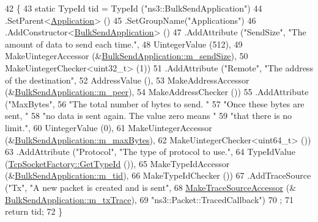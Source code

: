 \begin{DoxyCode}
42 \{
43   \textcolor{keyword}{static} TypeId tid = TypeId (\textcolor{stringliteral}{"ns3::BulkSendApplication"})
44     .SetParent<\hyperlink{classns3_1_1Application_acd261926c72b02cdb48fc7f8838ee173}{Application}> ()
45     .SetGroupName(\textcolor{stringliteral}{"Applications"}) 
46     .AddConstructor<\hyperlink{classns3_1_1BulkSendApplication_ac353edd318da96e4b01591ef4625a1da}{BulkSendApplication}> ()
47     .AddAttribute (\textcolor{stringliteral}{"SendSize"}, \textcolor{stringliteral}{"The amount of data to send each time."},
48                    UintegerValue (512),
49                    MakeUintegerAccessor (&\hyperlink{classns3_1_1BulkSendApplication_a9546f4e64ebd4043c2054a6830430f12}{BulkSendApplication::m\_sendSize}),
50                    MakeUintegerChecker<uint32\_t> (1))
51     .AddAttribute (\textcolor{stringliteral}{"Remote"}, \textcolor{stringliteral}{"The address of the destination"},
52                    AddressValue (),
53                    MakeAddressAccessor (&\hyperlink{classns3_1_1BulkSendApplication_a0f4c02d4849b50e26ba6f5cbc90d56c4}{BulkSendApplication::m\_peer}),
54                    MakeAddressChecker ())
55     .AddAttribute (\textcolor{stringliteral}{"MaxBytes"},
56                    \textcolor{stringliteral}{"The total number of bytes to send. "}
57                    \textcolor{stringliteral}{"Once these bytes are sent, "}
58                    \textcolor{stringliteral}{"no data  is sent again. The value zero means "}
59                    \textcolor{stringliteral}{"that there is no limit."},
60                    UintegerValue (0),
61                    MakeUintegerAccessor (&\hyperlink{classns3_1_1BulkSendApplication_aaada1266be784683ddfa76dc71efbc06}{BulkSendApplication::m\_maxBytes}),
62                    MakeUintegerChecker<uint64\_t> ())
63     .AddAttribute (\textcolor{stringliteral}{"Protocol"}, \textcolor{stringliteral}{"The type of protocol to use."},
64                    TypeIdValue (\hyperlink{classns3_1_1TcpSocketFactory_a29c295f0b282f52d7c903768f80607b0}{TcpSocketFactory::GetTypeId} ()),
65                    MakeTypeIdAccessor (&\hyperlink{classns3_1_1BulkSendApplication_aae69cccb430dce06f51f507bccbb8396}{BulkSendApplication::m\_tid}),
66                    MakeTypeIdChecker ())
67     .AddTraceSource (\textcolor{stringliteral}{"Tx"}, \textcolor{stringliteral}{"A new packet is created and is sent"},
68                      \hyperlink{group__tracing_gab21a770b9855af4e8f69f7531ea4a6b0}{MakeTraceSourceAccessor} (&
      \hyperlink{classns3_1_1BulkSendApplication_a982bb90de3aab9858bc23c1fd3e5987e}{BulkSendApplication::m\_txTrace}),
69                      \textcolor{stringliteral}{"ns3::Packet::TracedCallback"})
70   ;
71   \textcolor{keywordflow}{return} tid;
72 \}
\end{DoxyCode}



